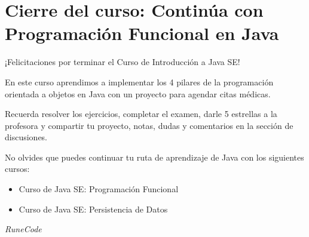 \documentclass{article}
\begin{document}
\section{Cierre del curso: Continúa con Programación Funcional en Java}%
¡Felicitaciones por terminar el Curso de Introducción a Java SE!

En este curso aprendimos a implementar los 4 pilares de la programación
orientada a objetos en Java con un proyecto para agendar citas médicas.

Recuerda resolver los ejercicios, completar el examen, darle 5 estrellas a la
profesora y compartir tu proyecto, notas, dudas y comentarios en la sección de
discusiones.

No olvides que puedes continuar tu ruta de aprendizaje de Java con los
siguientes cursos:

\begin{itemize}
  \item Curso de Java SE: Programación Funcional
  \item Curso de Java SE: Persistencia de Datos
\end{itemize}



































\vspace{2cm}
\LARGE\textit{RuneCode}
\end{document}
